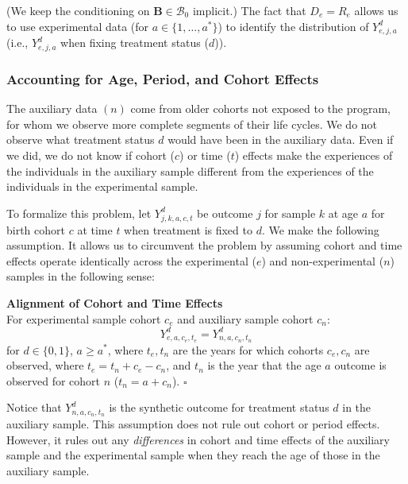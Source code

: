 \noindent (We keep the conditioning on $\bm{B} \in \mathcal{B}_0$ implicit.) The fact that $D_e = R_e$ allows us to use experimental data (for $a \in \{1, \dots,a^*\}$) to identify the distribution of $Y_{e,j,a}^d$ (i.e., $Y_{e,j,a}^d$ when fixing treatment status ($d$)).

\subsubsection{Accounting for Age, Period, and Cohort Effects}

The auxiliary data $(n)$ come from older cohorts not exposed to the program, for whom we observe more complete segments of their life cycles. We do not observe what treatment status $d$ would have been in the auxiliary data. Even if we did, we do not know if cohort ($c$) or time ($t$) effects make the experiences of the individuals in the auxiliary sample different from the experiences of the individuals in the experimental sample.

To formalize this problem, let $Y_{j,k,a,c,t}^d$ be outcome $j$ for sample $k$ at age $a$ for birth cohort $c$ at time $t$ when treatment is fixed to $d$. We make the following assumption. It allows us to circumvent the problem by assuming cohort and time effects operate identically across the experimental ($e$) and non-experimental ($n$) samples in the following sense:

\onehalfspacing
\begin{assumption}\label{ass:alignment} \textbf{Alignment of Cohort and Time Effects}\\
For experimental sample cohort $c_{e}$ and auxiliary sample cohort $c_{n}$:
\begin{equation}
Y_{e,a,c_{e},t_{e}}^d = Y_{n,a,c_{n},t_{n}}^d
\end{equation}
for $d \in \{ 0, 1\}$, $a \geq a^*$, where $t_{e}, t_{n}$ are the years for which cohorts $c_{e}, c_{n}$ are observed, where $t_e = t_n + c_e - c_n$, and $t_n$ is the year that the age $a$ outcome is observed for cohort $n$ ($t_n = a + c_n$). $\square$
\end{assumption}
\doublespacing

Notice that $Y^d_{n,a,{c_n},{t_n}}$ is the synthetic outcome for treatment status $d$ in the auxiliary sample. This assumption does not rule out cohort or period effects. However, it rules out any \emph{differences} in cohort and time effects of the auxiliary sample and the experimental sample when they reach the age of those in the auxiliary sample.

